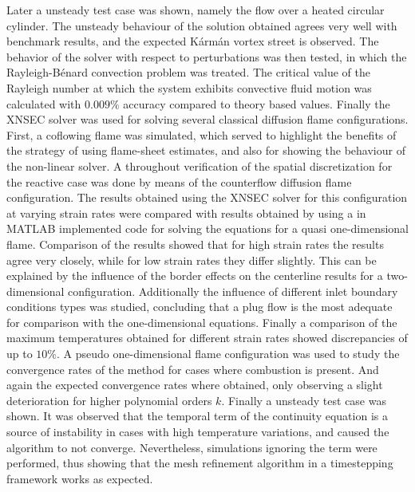 Later a unsteady test case was shown, namely the flow over a heated circular cylinder. The unsteady behaviour of the solution obtained agrees very well with benchmark results, and the expected Kármán vortex street is observed. The behavior of the solver with respect to perturbations was then tested, in which the Rayleigh-Bénard convection problem was treated. The critical value of the Rayleigh number at which the system exhibits convective fluid motion was calculated with $0.009\%$ accuracy compared to theory based values. 
Finally the XNSEC solver was used for solving several classical diffusion flame configurations. First, a coflowing flame was simulated, which served to highlight the benefits of the strategy of using flame-sheet estimates, and also for showing the behaviour of the non-linear solver.
A throughout verification of the spatial discretization for the reactive case was done by means of the counterflow diffusion flame configuration. The results obtained using the XNSEC solver for this configuration at varying strain rates were compared with results obtained by using a in MATLAB implemented code for solving the equations for a quasi one-dimensional flame. Comparison of the results showed that for high strain rates the results agree very closely, while for low strain rates they differ slightly. This can be explained by the influence of the border effects on the centerline results for a two-dimensional configuration. Additionally the influence of different inlet boundary conditions types was studied, concluding that a plug flow is the most adequate for comparison with the one-dimensional equations. Finally a comparison of the maximum temperatures obtained for different strain rates showed discrepancies of up to $10\%$.
A pseudo one-dimensional flame configuration was used to study the convergence rates of the method for cases where combustion is present. And again the expected convergence rates where obtained, only observing a slight deterioration for higher polynomial orders $k$. Finally a unsteady test case was shown. It was observed that the temporal term of the continuity equation is a source of instability in cases with high temperature variations, and caused the algorithm to not converge. Nevertheless, simulations ignoring the term were performed, thus showing that the mesh refinement algorithm in a timestepping framework works as expected.

